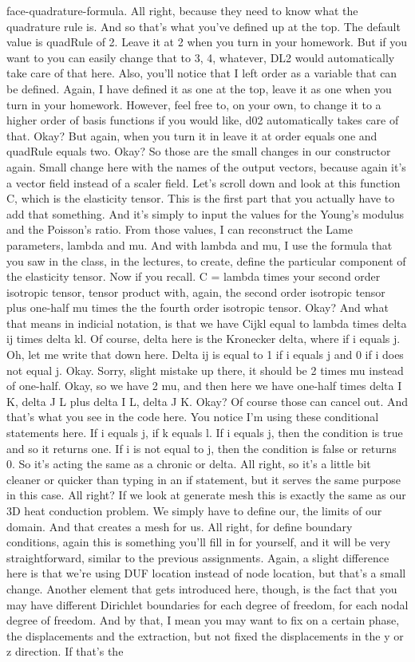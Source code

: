 \documentclass[10pt]{article}
\begin{document}
face-quadrature-formula. All right, because they need to know what the quadrature rule is. And so that's what you've defined up at the top. The default value is quadRule of 2. Leave it at 2 when you turn in your homework. But if you want to you can easily change that to 3, 4, whatever, DL2 would automatically take care of that here. Also, you'll notice that I left order as a variable that can be defined. Again, I have defined it as one at the top, leave it as one when you turn in your homework. However, feel free to, on your own, to change it to a higher order of basis functions if you would like, d02 automatically takes care of that. Okay? But again, when you turn it in leave it at order equals one and quadRule equals two. Okay? So those are the small changes in our constructor again. Small change here with the names of the output vectors, because again it's a vector field instead of a scaler field. Let's scroll down and look at this function C, which is the elasticity tensor. This is the first part that you actually have to add that something. And it's simply to input the values for the Young's modulus and the Poisson's ratio. From those values, I can reconstruct the Lame parameters, lambda and mu. And with lambda and mu, I use the formula that you saw in the class, in the lectures, to create, define the particular component of the elasticity tensor. Now if you recall. C = lambda times your second order isotropic tensor, tensor product with, again, the second order isotropic tensor plus one-half mu times the the fourth order isotropic tensor. Okay? And what that means in indicial notation, is that we have Cijkl equal to lambda times delta ij times delta kl. Of course, delta here is the Kronecker delta, where if i equals j. Oh, let me write that down here. Delta ij is equal to 1 if i equals j and 0 if i does not equal j. Okay. Sorry, slight mistake up there, it should be 2 times mu instead of one-half. Okay, so we have 2 mu, and then here we have one-half times delta I K, delta J L plus delta I L, delta J K. Okay? Of course those can cancel out. And that's what you see in the code here. You notice I'm using these conditional statements here. If i equals j, if k equals l. If i equals j, then the condition is true and so it returns one. If i is not equal to j, then the condition is false or returns 0. So it's acting the same as a chronic or delta. All right, so it's a little bit cleaner or quicker than typing in an if statement, but it serves the same purpose in this case. All right? If we look at generate mesh this is exactly the same as our 3D heat conduction problem. We simply have to define our, the limits of our domain. And that creates a mesh for us. All right, for define boundary conditions, again this is something you'll fill in for yourself, and it will be very straightforward, similar to the previous assignments. Again, a slight difference here is that we're using DUF location instead of node location, but that's a small change. Another element that gets introduced here, though, is the fact that you may have different Dirichlet boundaries for each degree of freedom, for each nodal degree of freedom. And by that, I mean you may want to fix on a certain phase, the displacements and the extraction, but not fixed the displacements in the y or z direction. If that's the 
\end{document}

